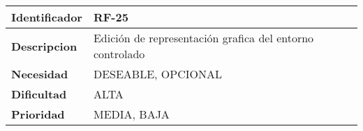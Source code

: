 \begin{center}
    \begin{tabular}{|p{2.6cm}|p{12cm}|}
    \hline
    \textbf{Identificador} & RF-25\\
    \hline
    \textbf{Descripcion} & Edición de representación grafica del entorno controlado\\
    \hline
    \textbf{Necesidad} & DESEABLE, OPCIONAL\\
    \hline
    \textbf{Dificultad} & ALTA\\
    \hline
    \textbf{Prioridad} & MEDIA, BAJA\\
    \hline
    \end{tabular}
\end{center}
